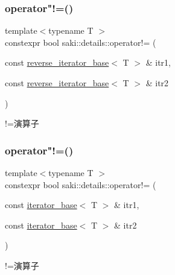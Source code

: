\subsubsection{\texorpdfstring{operator"!=()}{operator!=()}\hspace{0.1cm}{\footnotesize\ttfamily [1/2]}}
{\footnotesize\ttfamily template$<$typename T $>$ \\
constexpr bool saki\+::details\+::operator!= (\begin{DoxyParamCaption}\item[{const \mbox{\hyperlink{classsaki_1_1details_1_1reverse__iterator__base}{reverse\+\_\+iterator\+\_\+base}}$<$ T $>$ \&}]{itr1,  }\item[{const \mbox{\hyperlink{classsaki_1_1details_1_1reverse__iterator__base}{reverse\+\_\+iterator\+\_\+base}}$<$ T $>$ \&}]{itr2 }\end{DoxyParamCaption})}



!=演算子 

\mbox{\label{namespacesaki_1_1details_ab425131a223957045b2744e15c53d36f}} 
\subsubsection{\texorpdfstring{operator"!=()}{operator!=()}\hspace{0.1cm}{\footnotesize\ttfamily [2/2]}}
{\footnotesize\ttfamily template$<$typename T $>$ \\
constexpr bool saki\+::details\+::operator!= (\begin{DoxyParamCaption}\item[{const \mbox{\hyperlink{classsaki_1_1details_1_1iterator__base}{iterator\+\_\+base}}$<$ T $>$ \&}]{itr1,  }\item[{const \mbox{\hyperlink{classsaki_1_1details_1_1iterator__base}{iterator\+\_\+base}}$<$ T $>$ \&}]{itr2 }\end{DoxyParamCaption})}



!=演算子 

\mbox{\label{namespacesaki_1_1details_ac39a55e205a0ce7eca13df0569358fe2}} 
